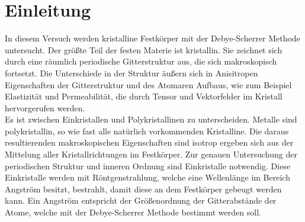 \section{Einleitung}
\label{sec:Einleitung}
In diesem Versuch werden kristalline Festkörper mit der Debye-Scherrer Methode untersucht. 
Der größte Teil der festen Materie ist kristallin. 
Sie zeichnet sich durch eine räumlich periodische Gitterstruktur aus, die sich makroskopisch fortsetzt. 
Die Unterschiede in der Struktur äußern sich in Anisitropen Eigenschaften der Gitterstruktur  und des Atomaren Aufbaus, wie zum Beispiel Elastizität und Permeabilität, die durch Tensor und Vektorfelder im Kristall hervorgerufen werden.\\
Es ist zwischen Einkristallen und Polykristallinen zu unterscheiden. 
Metalle sind polykristallin, so wie fast alle natürlich vorkommenden Kristalline.
Die daraus resultierenden makroskopischen Eigenschaften sind isotrop ergeben sich aus der Mittelung aller Kristallrichtungen im Festkörper.
Zur genauen Untersuchung der periodischen Struktur und inneren Ordnung sind Einkristalle notwendig.  
Diese Einkristalle werden mit Röntgenstrahlung, welche eine Wellenlänge im Bereich Angström besitzt, bestrahlt, damit diese an dem Festkörper gebeugt werden kann.
Ein Angström entspricht der Größenordnung der Gitterabstände der Atome, welche mit der Debye-Scherrer Methode bestimmt werden soll.	